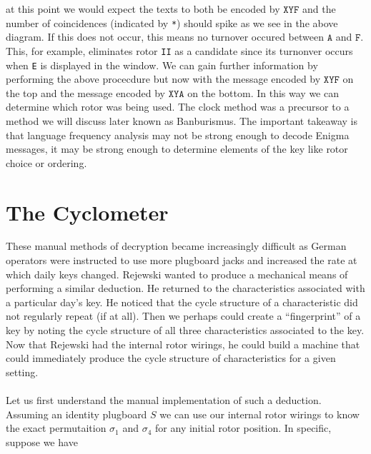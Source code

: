 at this point we would expect the texts to both be encoded by
$\texttt{XYF}$ and the number of coincidences (indicated by
\texttt{*}) should spike as we see in the above diagram. If this does
not occur, this means no turnover occured between $\texttt{A}$ and
$\texttt{F}$. This, for example, eliminates rotor \texttt{II} as a
candidate since its turnonver occurs when \texttt{E} is displayed in
the window. We can gain further information by performing the above
procecdure but now with the message encoded by $\texttt{XYF}$ on the
top and the message encoded by $\texttt{XYA}$ on the bottom. In this
way we can determine which rotor was being used. The clock method was
a precursor to a method we will discuss later known as Banburismus.
The important takeaway is that language frequency analysis may not be
strong enough to decode Enigma messages, it may be strong enough to
determine elements of the key like rotor choice or ordering.

\section{The Cyclometer}

These manual methods of decryption became increasingly difficult as
German operators were instructed to use more plugboard jacks and
increased the rate at which daily keys changed. Rejewski wanted to
produce a mechanical means of performing a similar deduction. He
returned to the characteristics associated with a particular day's
key. He noticed that the cycle structure of a characteristic did not
regularly repeat (if at all). Then we perhaps could create a
``fingerprint'' of a key by noting the cycle structure of all three
characteristics associated to the key. Now that Rejewski had the
internal rotor wirings, he could build a machine that could
immediately produce the cycle structure of characteristics for a given setting.
\\\\Let us first understand the manual implementation of such a
deduction. Assuming an identity plugboard $S$ we can use our internal
rotor wirings to know the exact permutaition $\sigma_1$ and
$\sigma_4$ for any initial rotor position. In specific, suppose we have

